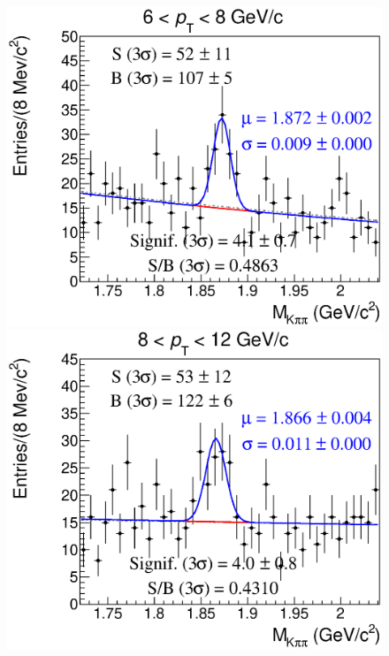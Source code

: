 \documentclass[b5paper,10pt,twoside,oldstyle,classica]{toptesi}
\begin{document}
\begin{figure}[h]
\begin{center}
{\includegraphics[scale = 0.25]{MassFitSet3_Pt4.eps}}
\hspace{0cm}
{\includegraphics[scale = 0.25]{MassFitSet3_Pt5.eps}}
\vspace{0cm}

\end{center}
\end{figure}
\end{document}
